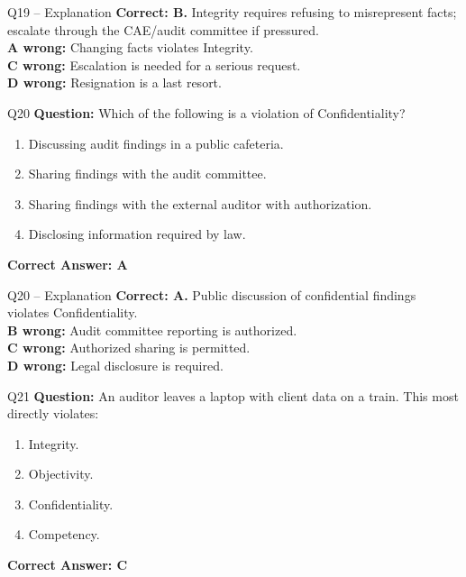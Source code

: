 \documentclass[aspectratio=169,10pt]{beamer}
\begin{document}
	\begin{frame}[t]{Q19 -- Explanation}
		\small
		\textbf{Correct: B.} Integrity requires refusing to misrepresent facts; escalate through the CAE/audit committee if pressured. \\[4pt]
		\textbf{A wrong:} Changing facts violates Integrity. \\[2pt]
		\textbf{C wrong:} Escalation is needed for a serious request. \\[2pt]
		\textbf{D wrong:} Resignation is a last resort.
	\end{frame}
	
	\begin{frame}[t]{Q20}
		\small
		\textbf{Question:} Which of the following is a violation of Confidentiality?
		\begin{enumerate}[label=\Alph*.,itemsep=1pt,topsep=2pt]
			\item Discussing audit findings in a public cafeteria.
			\item Sharing findings with the audit committee.
			\item Sharing findings with the external auditor with authorization.
			\item Disclosing information required by law.
		\end{enumerate}
		\vspace{4pt}
		\textbf{Correct Answer: A}
	\end{frame}
	
	\begin{frame}[t]{Q20 -- Explanation}
		\small
		\textbf{Correct: A.} Public discussion of confidential findings violates Confidentiality. \\[4pt]
		\textbf{B wrong:} Audit committee reporting is authorized. \\[2pt]
		\textbf{C wrong:} Authorized sharing is permitted. \\[2pt]
		\textbf{D wrong:} Legal disclosure is required.
	\end{frame}
	
	\begin{frame}[t]{Q21}
		\small
		\textbf{Question:} An auditor leaves a laptop with client data on a train. This most directly violates:
		\begin{enumerate}[label=\Alph*.,itemsep=1pt,topsep=2pt]
			\item Integrity.
			\item Objectivity.
			\item Confidentiality.
			\item Competency.
		\end{enumerate}
		\vspace{4pt}
		\textbf{Correct Answer: C}
	\end{frame}
	
\end{document}
